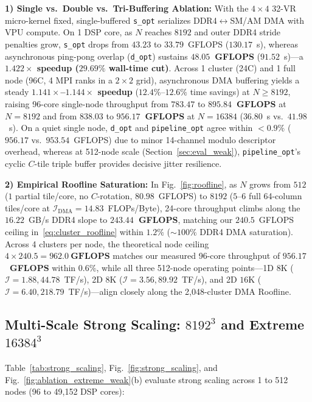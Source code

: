 \documentclass[journal]{IEEEtran}
\begin{document}
\textbf{1) Single vs.\ Double vs.\ Tri-Buffering Ablation:} With the $4 \times 4$ 32-VR micro-kernel fixed, single-buffered \texttt{s\_opt} serializes DDR4$\leftrightarrow$SM/AM DMA with VPU compute. On 1 DSP core, as $N$ reaches $8192$ and outer DDR4 stride penalties grow, \texttt{s\_opt} drops from $43.23$ to $33.79$~GFLOPS ($130.17$~s), whereas asynchronous ping-pong overlap (\texttt{d\_opt}) sustains \textbf{$48.05$~GFLOPS} ($91.52$~s)---a \textbf{$1.422\times$ speedup ($29.69\%$ wall-time cut)}. Across 1 cluster (24C) and 1 full node (96C, 4 MPI ranks in a $2 \times 2$ grid), asynchronous DMA buffering yields a steady \textbf{$1.141\times$--$1.144\times$ speedup} ($12.4\%$--$12.6\%$ time savings) at $N \ge 8192$, raising 96-core single-node throughput from $783.47$ to \textbf{$895.84$~GFLOPS} at $N=8192$ and from $838.03$ to \textbf{$956.17$~GFLOPS} at $N=16384$ ($36.80$~s vs.\ $41.98$~s). On a quiet single node, \texttt{d\_opt} and \texttt{pipeline\_opt} agree within $<\!0.9\%$ ($956.17$ vs.\ $953.54$~GFLOPS) due to minor 14-channel modulo descriptor overhead, whereas at 512-node scale (Section~\ref{sec:eval_weak}), \texttt{pipeline\_opt}'s cyclic $C$-tile triple buffer provides decisive jitter resilience.

\textbf{2) Empirical Roofline Saturation:} In Fig.~\ref{fig:roofline}, as $N$ grows from $512$ ($1$ partial tile/core, no $C$-rotation, $80.98$~GFLOPS) to $8192$ ($5$--$6$ full 64-column tiles/core at $\mathcal{I}_{\mathrm{DMA}} = 14.83$~FLOPs/Byte), 24-core throughput climbs along the $16.22$~GB/s DDR4 slope to \textbf{$243.44$~GFLOPS}, matching our $240.5$~GFLOPS ceiling in~\eqref{eq:cluster_roofline} within $1.2\%$ ($\sim\!100\%$ DDR4 DMA saturation). Across 4 clusters per node, the theoretical node ceiling $4 \times 240.5 = \mathbf{962.0~\text{GFLOPS}}$ matches our measured 96-core throughput of \textbf{$956.17$~GFLOPS} within $0.6\%$, while all three 512-node operating points---1D $8\text{K}$ ($\mathcal{I}\!=\!1.88, 44.78$~TF/s), 2D $8\text{K}$ ($\mathcal{I}\!=\!3.56, 89.92$~TF/s), and 2D $16\text{K}$ ($\mathcal{I}\!=\!6.40, 218.79$~TF/s)---align closely along the 2,048-cluster DMA Roofline.

\subsection{Multi-Scale Strong Scaling: $8192^3$ and Extreme $16384^3$}
\label{sec:eval_scaling}
Table~\ref{tab:strong_scaling}, Fig.~\ref{fig:strong_scaling}, and Fig.~\ref{fig:ablation_extreme_weak}(b) evaluate strong scaling across 1 to 512 nodes (96 to 49,152 DSP cores):
\end{document}
